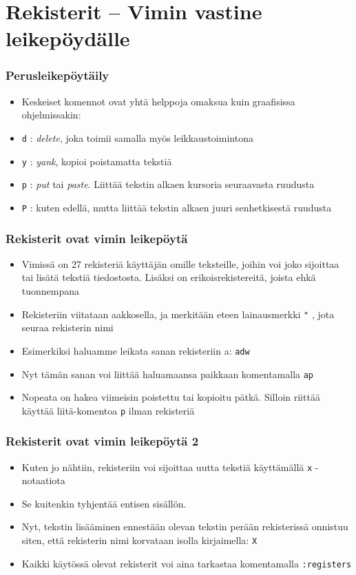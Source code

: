 \documentclass[]{beamer}
\newcommand{\Tohj}[1]{\texttt{#1}}
\newcommand{\com}[1]{{\color{blue!50!black}\Tohj{#1}} \!\!}
\begin{document}
\section {Rekisterit -- Vimin vastine leikepöydälle}

\begin{frame}
    \frametitle{Perusleikepöytäily}
    \begin{itemize}
        \item Keskeiset komennot ovat yhtä helppoja omaksua kuin graafisissa ohjelmissakin:
        \item \com{d}: \emph{delete}, joka toimii samalla myös leikkaustoimintona
        \item \com{y}: \emph{yank}, kopioi poistamatta tekstiä
        \item \com{p}: \emph{put} tai \emph{paste}. Liittää tekstin alkaen kursoria seuraavasta ruudusta
        \item \com{P}: kuten edellä, mutta liittää tekstin alkaen juuri senhetkisestä ruudusta
    \end{itemize}
\end{frame}

\begin{frame}
    \frametitle{Rekisterit ovat vimin leikepöytä}
    \begin{itemize}
        \item Vimissä on 27 rekisteriä käyttäjän omille teksteille, joihin voi joko sijoittaa tai lisätä tekstiä tiedostosta. Lisäksi on erikoisrekistereitä, joista ehkä tuonnempana
        \item Rekisteriin viitataan aakkosella, ja merkitään eteen lainausmerkki \com{"}, jota seuraa rekisterin nimi
        \pause
        \item Esimerkiksi haluamme leikata sanan rekisteriin a: \com{\textquotedbl adw}
        \item Nyt tämän sanan voi liittää haluamaansa paikkaan komentamalla \com{\textquotedbl ap}
        \item Nopeata on hakea viimeisin poistettu tai kopioitu pätkä. Silloin riittää käyttää liitä-komentoa \com{p} ilman rekisteriä
    \end{itemize}
\end{frame}

\begin{frame}
    \frametitle{Rekisterit ovat vimin leikepöytä 2}
    \begin{itemize}
        \item Kuten jo nähtiin, rekisteriin voi sijoittaa uutta tekstiä käyttämällä \com{\textquotedbl x} -notaatiota
        \item Se kuitenkin tyhjentää entisen sisällön.
        \pause
        \item Nyt, tekstin lisääminen ennestään olevan tekstin perään rekisterissä onnistuu siten, että rekisterin nimi korvataan isolla kirjaimella: \com{\textquotedbl X}
        \pause
        \item Kaikki käytössä olevat rekisterit voi aina tarkastaa komentamalla \com{:registers}
    \end{itemize}
\end{frame}
\end{document}

